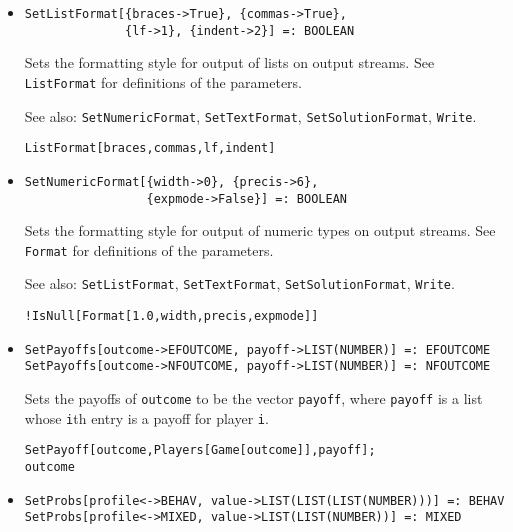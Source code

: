 \begin{itemize}
\item{}
\protect \large \begin{verbatim}
SetListFormat[{braces->True}, {commas->True}, 
              {lf->1}, {indent->2}] =: BOOLEAN 
\end{verbatim} \normalsize

\bd
Sets the formatting style for output of lists on output streams. See
\verb+ListFormat+ for definitions of the parameters. 
\item [See also:] \verb+SetNumericFormat+, \verb+SetTextFormat+,
\verb+SetSolutionFormat+, \verb+Write+.
\begin{verbatim}
ListFormat[braces,commas,lf,indent]
\end{verbatim} 
\ed

\item{}
\protect \large \begin{verbatim}
SetNumericFormat[{width->0}, {precis->6}, 
                 {expmode->False}] =: BOOLEAN 
\end{verbatim}\normalsize

\bd Sets the formatting style for output of numeric types on output
streams.  See \verb+Format+ for definitions of the parameters.
\item [See also:] \verb+SetListFormat+, \verb+SetTextFormat+, 
\verb+SetSolutionFormat+, \verb+Write+.
\begin{verbatim}
!IsNull[Format[1.0,width,precis,expmode]]
\end{verbatim} 
\ed

\item{}
\protect \large \begin{verbatim}
SetPayoffs[outcome->EFOUTCOME, payoff->LIST(NUMBER)] =: EFOUTCOME 
SetPayoffs[outcome->NFOUTCOME, payoff->LIST(NUMBER)] =: NFOUTCOME 
\end{verbatim}\normalsize
 
\bd 

Sets the payoffs of \verb+outcome+ to be the vector \verb+payoff+,
where \verb+payoff+ is a list whose \verb+i+th entry is a payoff for
player \verb+i+.
\begin{verbatim}
SetPayoff[outcome,Players[Game[outcome]],payoff];
outcome
\end{verbatim} 
\ed

\item{}
\protect \large \begin{verbatim}
SetProbs[profile<->BEHAV, value->LIST(LIST(LIST(NUMBER)))] =: BEHAV 
SetProbs[profile<->MIXED, value->LIST(LIST(NUMBER))] =: MIXED 
\end{verbatim}\normalsize


\end{itemize}
